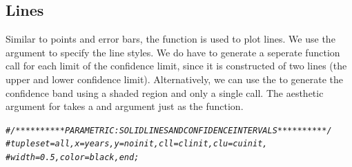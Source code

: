\documentclass[nojss]{jss}\usepackage[]{graphicx}\usepackage[]{color}
\makeatletter
\newcommand{\hlcom}[1]{\textcolor[rgb]{0.678,0.584,0.686}{\textit{#1}}}%
\newenvironment{kframe}{%
 \def\at@end@of@kframe{}%
 \ifinner\ifhmode%
  \def\at@end@of@kframe{\end{minipage}}%
  \begin{minipage}{\columnwidth}%
 \fi\fi%
 \def\FrameCommand##1{\hskip\@totalleftmargin \hskip-\fboxsep
 \colorbox{shadecolor}{##1}\hskip-\fboxsep
     \hskip-\linewidth \hskip-\@totalleftmargin \hskip\columnwidth}%
 \MakeFramed {\advance\hsize-\width
   \@totalleftmargin\z@ \linewidth\hsize
   \@setminipage}}%
 {\par\unskip\endMakeFramed%
 \at@end@of@kframe}
\newenvironment{knitrout}{}{} %
\makeatother
\begin{document}
\subsection{Lines}\label{S:lines}
Similar to points and error bars, the  function is used to plot lines. We use the  argument to specify the line styles. We do have to generate a seperate  function call for each limit of the confidence limit, since it is constructed of two lines (the upper and lower confidence limit). Alternatively, we can use the  to generate the confidence band using a shaded region and only a single call. The aesthetic argument for  takes a  and  argument just as the  function.
\begin{knitrout}\footnotesize
{}\color{fgcolor}\begin{kframe}
\begin{alltt}
\hlcom{# /**********PARAMETRIC : SOLID LINES AND CONFIDENCE INTERVALS**********/      }
\hlcom{# tuple set=all, x=years, y=noinit, cll=clinit, clu=cuinit,}
\hlcom{# width=0.5,color=black, end;}


\end{alltt}
\end{kframe}
\end{knitrout}
\end{document}
